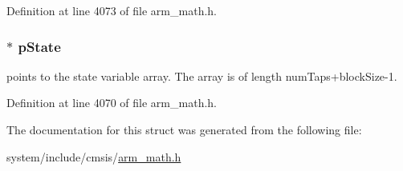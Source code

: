 Definition at line 4073 of file arm\+\_\+math.\+h.

\subsubsection[{\texorpdfstring{p\+State}{pState}}]{$\ast$ p\+State}\hypertarget{structarm__lms__instance__q31_adee4ba3ee8869865af7d8fa08ca913d6}{}\label{structarm__lms__instance__q31_adee4ba3ee8869865af7d8fa08ca913d6}
points to the state variable array. The array is of length num\+Taps+block\+Size-\/1. 

Definition at line 4070 of file arm\+\_\+math.\+h.



The documentation for this struct was generated from the following file\+:\begin{DoxyCompactItemize}
\item 
system/include/cmsis/\hyperlink{arm__math_8h}{arm\+\_\+math.\+h}\end{DoxyCompactItemize}

